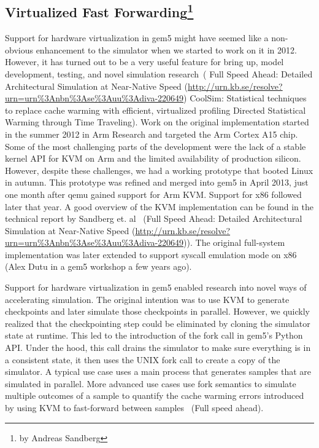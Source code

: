 \subsection[Virtualized Fast Forwarding]{Virtualized Fast Forwarding\footnote{by Andreas Sandberg}}

Support for hardware virtualization in gem5 might have seemed like a non-obvious enhancement to the simulator when we started to work on it in 2012.
However, it has turned out to be a very useful feature for bring up, model development, testing, and novel simulation research~\cite{}(
Full Speed Ahead: Detailed Architectural Simulation at Near-Native Speed (\url{http://urn.kb.se/resolve?urn=urn%3Anbn%3Ase%3Auu%3Adiva-220649})
CoolSim: Statistical techniques to replace cache warming with efficient, virtualized profiling
Directed Statistical Warming through Time Traveling).
Work on the original implementation started in the summer 2012 in Arm Research and targeted the Arm Cortex A15 chip. Some of the most challenging parts of the development were the lack of a stable kernel API for KVM on Arm and the limited availability of production silicon.
However, despite these challenges, we had a working prototype that booted Linux in autumn.
This prototype was refined and merged into gem5 in April 2013, just one month after qemu gained support for Arm KVM.
Support for x86 followed later that year.
A good overview of the KVM implementation can be found in the technical report by Sandberg et. al~\cite{} (Full Speed Ahead: Detailed Architectural Simulation at Near-Native Speed (\url{http://urn.kb.se/resolve?urn=urn%3Anbn%3Ase%3Auu%3Adiva-220649})).
The original full-system implementation was later extended to support syscall emulation mode on x86~\cite{} (Alex Dutu in a gem5 workshop a few years ago).

Support for hardware virtualization in gem5 enabled research into novel ways of accelerating simulation.
The original intention was to use KVM to generate checkpoints and later simulate those checkpoints in parallel.
However, we quickly realized that the checkpointing step could be eliminated by cloning the simulator state at runtime.
This led to the introduction of the fork call in gem5's Python API.
Under the hood, this call drains the simulator to make sure everything is in a consistent state, it then uses the UNIX fork call to create a copy of the simulator.
A typical use case uses a main process that generates samples that are simulated in parallel.
More advanced use cases use fork semantics to simulate multiple outcomes of a sample to quantify the cache warming errors introduced by using KVM to fast-forward between samples~\cite{} (Full speed ahead).
